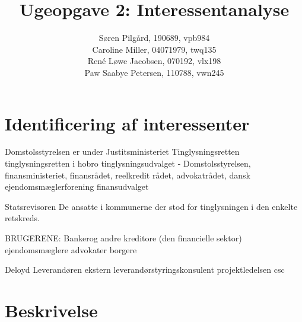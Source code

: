 \documentclass[10pt,a4paper,danish]{article}
\title{Ugeopgave 2: Interessentanalyse}
\author{Søren Pilgård, 190689, vpb984\\
Caroline Miller, 04071979, twq135\\
René Løwe Jacobsen, 070192, vlx198\\
Paw Saabye Petersen, 110788, vwn245}
\begin{document}
\maketitle
\newpage


\section{Identificering af interessenter}
Domstolsstyrelsen er under
Justitsministeriet
Tinglysningsretten
tinglysningsretten i hobro
tinglysningsudvalget - Domstolsstyrelsen, finansministeriet, finansrådet, reelkredit rådet, advokatrådet, dansk ejendomsmæglerforening
finansudvalget

Statsrevisoren
De ansatte i kommunerne der stod for tinglysningen i den enkelte retskreds.

BRUGERENE:
Bankerog andre kreditore (den financielle sektor)
ejendomsmæglere
advokater
borgere

Deloyd
Leverandøren
ekstern leverandørstyringskonsulent
projektledelsen
csc

\section{Beskrivelse}
\end{document}

